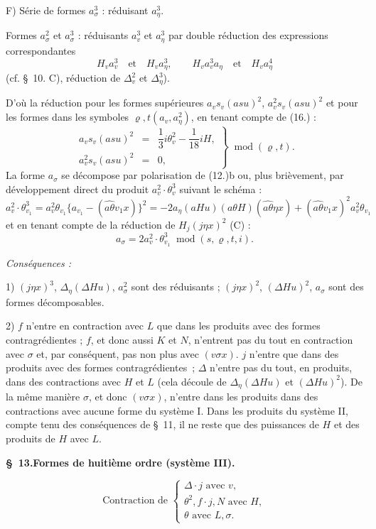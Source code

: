 \documentclass[11pt]{article}
\newcommand{\A}{\Delta}
\newcommand{\R}{\varrho}
\newcommand{\modu}[1]{\;\operatorname{mod} #1}
\providecommand{\modu}[1]{\;\operatorname{mod} #1}
\begin{document}
\noindent F) Série de formes $a_\sigma^3$ : réduisant $a_\eta^3$.

Formes $a_\sigma^2$ et $a_\sigma^3$ : réduisants $a_v^3$ et $a_\eta^3$ par double réduction des expressions correspondantes
\[
H_v a_v^3\quad\text{et}\quad H_v a_\eta^3,
\qquad
H_v a_v^3a_\eta\quad\text{et}\quad H_v a_\eta^4
\]
(cf. \S\ 10. C), réduction de $\A_v^2$ et $\A_\eta^3$).

D'où la réduction pour les formes supérieures $a_v s_v(asu)^2$, $a_v^2s_v(asu)^2$ et pour les formes dans les symboles $\R,t(a_v,a_\eta^2)$, en tenant compte de (16.) :
\[
\tag{19}
\displaystyle
\left.\begin{array}{rcl}
a_v s_v(asu)^2&=&\dfrac13 i\theta_v^2-\dfrac1{18}iH,\\[0.5em]
a_v^2s_v(asu)^2&=&0,
\end{array}\right\}\modu{(\R,t)}.
\]
La forme $a_\sigma$ se décompose par polarisation de (12.)b ou, plus brièvement, par développement direct du produit $a_v^2\cdot\theta_v^3$ suivant le schéma :
\[
a_v^2\cdot\theta_{v_1}^3=a_v^2\theta_{v_1}\{a_{v_1}-(\widehat{a\theta}v_1x)\}^2
=-2a_\eta(aHu)(a\theta H)(\widehat{a\theta}\eta x)+(\widehat{a\theta}v_1x)^2a_v^2\theta_{v_1}
\]
et en tenant compte de la réduction de $H_j(j\eta x)^2$ (C) :
\[
\tag{20}\displaystyle a_\sigma=2a_v^2\cdot\theta_{v_1}^3\modu{(s,\R,t,i)}.
\]

\noindent\emph{Conséquences :}

1) $(j\eta x)^3$, $\A_\eta(\A Hu)$, $a_\sigma^2$ sont des réduisants ; $(j\eta x)^2$, $(\A Hu)^2$, $a_\sigma$ sont des formes décomposables.

2) $f$ n'entre en contraction avec $L$ que dans les produits avec des formes contragrédientes ; $f$, et donc aussi $K$ et $N$, n'entrent pas du tout en contraction avec $\sigma$ et, par conséquent, pas non plus avec $(v\sigma x)$. $j$ n'entre que dans des produits avec des formes contragrédientes ; $\A$ n'entre pas du tout, en produits, dans des contractions avec $H$ et $L$ (cela découle de $\A_\eta(\A Hu)$ et $(\A Hu)^2$). De la même manière $\sigma$, et donc $(v\sigma x)$, n'entre dans les produits dans des contractions avec aucune forme du système I. Dans les produits du système II, compte tenu des conséquences de \S\ 11, il ne reste que des puissances de $H$ et des produits de $H$ avec $L$.

\begin{center}
\textbf{\S\ 13.\quad Formes de huitième ordre (système III).}
\end{center}
\[
\text{Contraction de }\left\{\begin{array}{l}
\A\cdot j\text{ avec }v,\\
\theta^2,
 f\cdot j,
 N\text{ avec }H,\\
\theta\text{ avec }L,\sigma.
\end{array}\right.
\]
\end{document}
